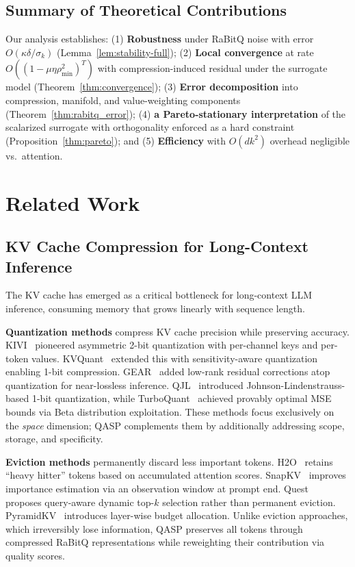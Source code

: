 \documentclass[twocolumn]{article}
\begin{document}
\subsection{Summary of Theoretical Contributions}

Our analysis establishes: (1) \textbf{Robustness} under RaBitQ noise with error $O(\kappa \delta / \sigma_k)$ (Lemma~\ref{lem:stability-full}); (2) \textbf{Local convergence} at rate $O((1 - \mu\eta\rho_{\min}^2)^T)$ with compression-induced residual under the surrogate model (Theorem~\ref{thm:convergence}); (3) \textbf{Error decomposition} into compression, manifold, and value-weighting components (Theorem~\ref{thm:rabitq_error}); (4) \textbf{a Pareto-stationary interpretation} of the scalarized surrogate with orthogonality enforced as a hard constraint (Proposition~\ref{thm:pareto}); and (5) \textbf{Efficiency} with $O(dk^2)$ overhead negligible vs.\ attention.



\section{Related Work}
\label{sec:related}

\subsection{KV Cache Compression for Long-Context Inference}

The KV cache has emerged as a critical bottleneck for long-context LLM inference, consuming memory that grows linearly with sequence length.

\textbf{Quantization methods} compress KV cache precision while preserving accuracy. KIVI~\cite{kivi} pioneered asymmetric 2-bit quantization with per-channel keys and per-token values. KVQuant~\cite{kvquant} extended this with sensitivity-aware quantization enabling 1-bit compression. GEAR~\cite{gearkv} added low-rank residual corrections atop quantization for near-lossless inference. QJL~\cite{qjl} introduced Johnson-Lindenstrauss-based 1-bit quantization, while TurboQuant~\cite{turboquant} achieved provably optimal MSE bounds via Beta distribution exploitation. These methods focus exclusively on the \emph{space} dimension; QASP complements them by additionally addressing scope, storage, and specificity.

\textbf{Eviction methods} permanently discard less important tokens. H2O~\cite{h2o} retains ``heavy hitter'' tokens based on accumulated attention scores. SnapKV~\cite{snapkv} improves importance estimation via an observation window at prompt end. Quest~\cite{quest} proposes query-aware dynamic top-$k$ selection rather than permanent eviction. PyramidKV~\cite{pyramidkv} introduces layer-wise budget allocation. Unlike eviction approaches, which irreversibly lose information, QASP preserves all tokens through compressed RaBitQ representations while reweighting their contribution via quality scores.
\end{document}
